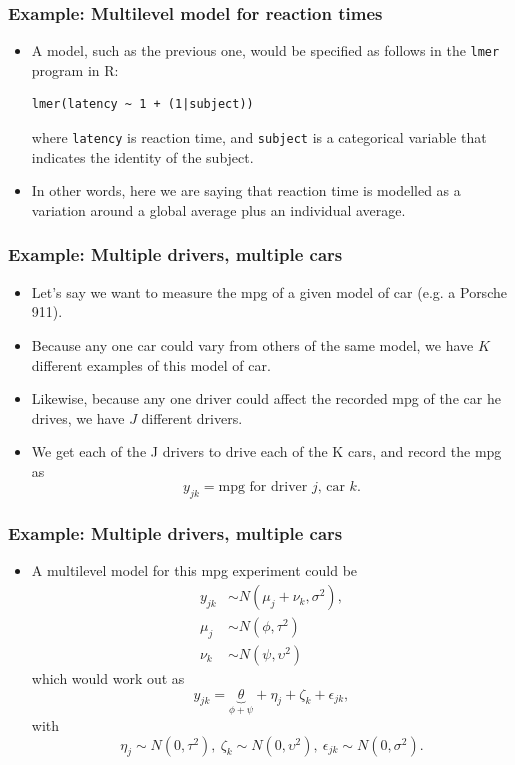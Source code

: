 \documentclass[10pt,xcolor=dvipsnames,serif,professionalfont]{beamer} %
\begin{document}
\begin{frame}[fragile]
\frametitle{Example: Multilevel model for reaction times}
\begin{itemize}
\item A model, such as the previous one, would be specified as follows in the \texttt{lmer} program in R:
\begin{center}
\begin{verbatim}
lmer(latency ~ 1 + (1|subject))
\end{verbatim}
\end{center}
where \texttt{latency} is reaction time, and \texttt{subject} is a categorical variable that indicates the identity of the subject.
\item In other words, here we are saying that reaction time is modelled as a variation around a global average plus an individual average.
\end{itemize}
\end{frame}


\begin{frame}
\frametitle{Example: Multiple drivers, multiple cars}
\begin{itemize}
\item Let's say we want to measure the mpg of a given model of car (e.g. a Porsche 911).
\item Because any one car could vary from others of the same model, we have $K$ different examples of this model of car.
\item Likewise, because any one driver could affect the recorded mpg of the car he drives, we have $J$ different drivers. 
\item We get each of the J drivers to drive each of the K cars, and record the mpg as 
\[y_{jk} = \text{mpg for driver $j$, car $k$}.\]
\end{itemize}
\end{frame}


\begin{frame}
\frametitle{Example: Multiple drivers, multiple cars}
\begin{itemize}
\item A multilevel model for this mpg experiment could be
\begin{align*}
y_{jk} &\sim N(\mu_{j} + \nu_k,\sigma^2),\\
\mu_{j} &\sim N(\phi,\tau^2)\\
\nu_{k} &\sim N(\psi,\upsilon^2)
\end{align*}
which would work out as 
\[y_{jk} = \underbrace{\theta}_{\phi + \psi} + \eta_j + \zeta_k + \epsilon_{jk},\]
with 
\[\eta_j \sim N(0,\tau^2),~ \zeta_k \sim N(0,\upsilon^2),~ \epsilon_{jk} \sim N(0,\sigma^2).\]
\end{itemize}
\end{frame}
\end{document}
